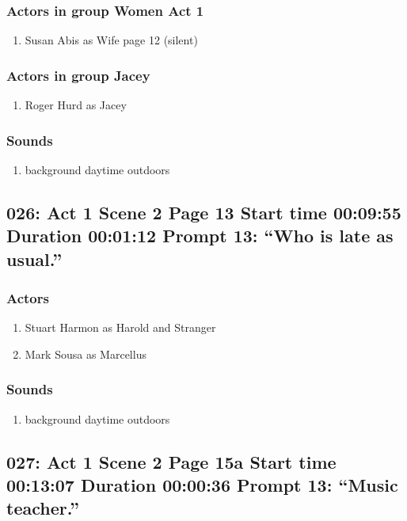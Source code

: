 \subsubsection{Actors in group Women Act 1}
\begin{enumerate}
\item Susan Abis as Wife page 12 (silent)
\end{enumerate}
\subsubsection{Actors in group Jacey}
\begin{enumerate}
\item Roger Hurd as Jacey
\end{enumerate}

\subsubsection{Sounds}
\begin{enumerate}
\item background daytime outdoors
\end{enumerate}
\subsection{026: Act 1 Scene 2 Page 13 Start time 00:09:55 Duration 00:01:12 Prompt 13: ``Who is late as usual.''}

\subsubsection{Actors}
\begin{enumerate}
\item Stuart Harmon as Harold and Stranger
\item Mark Sousa as Marcellus
\end{enumerate}

\subsubsection{Sounds}
\begin{enumerate}
\item background daytime outdoors
\end{enumerate}
\subsection{027: Act 1 Scene 2 Page 15a Start time 00:13:07 Duration 00:00:36 Prompt 13: ``Music teacher.''}

